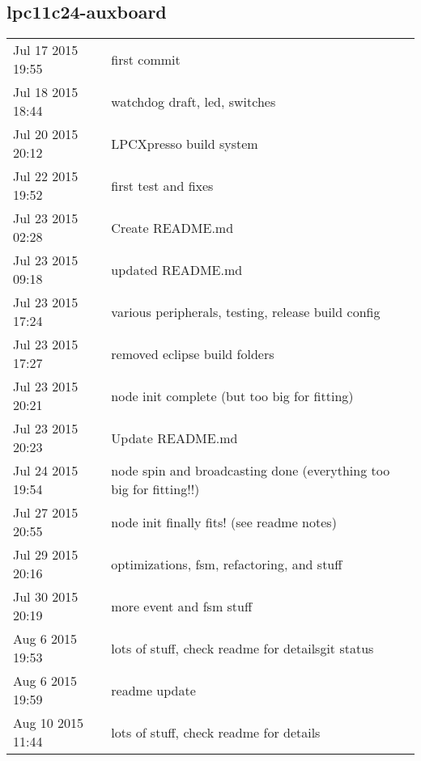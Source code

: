 \subsection{lpc11c24-auxboard}

\begin{tabular}{ l || p{9.5cm} }
	\hline			
	Jul 17 2015 19:55	& first commit	\\
	Jul 18 2015 18:44	& watchdog draft, led, switches	\\
	Jul 20 2015 20:12	& LPCXpresso build system	\\
	Jul 22 2015 19:52	& first test and fixes	\\
	Jul 23 2015 02:28	& Create README.md	\\
	Jul 23 2015 09:18	& updated README.md	\\
	Jul 23 2015 17:24	& various peripherals, testing, release build config	\\
	Jul 23 2015 17:27	& removed eclipse build folders	\\
	Jul 23 2015 20:21	& node init complete (but too big for fitting)	\\
	Jul 23 2015 20:23	& Update README.md	\\
	Jul 24 2015 19:54	& node spin and broadcasting done (everything too big for fitting!!)	\\
	Jul 27 2015 20:55	& node init finally fits! (see readme notes)	\\
	Jul 29 2015 20:16	& optimizations, fsm, refactoring, and stuff	\\
	Jul 30 2015 20:19	& more event and fsm stuff	\\
	Aug 6 2015 19:53	& lots of stuff, check readme for detailsgit status	\\
	Aug 6 2015 19:59	& readme update	\\
	Aug 10 2015 11:44	& lots of stuff, check readme for details	\\
	\hline  
\end{tabular}
